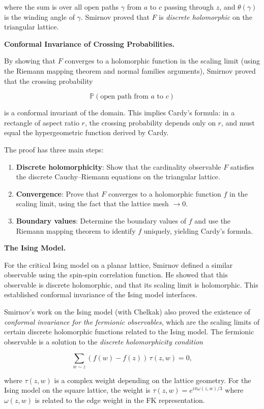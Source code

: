 where the sum is over all open paths $\gamma$ from $a$ to $c$ passing through $z$, and $\theta(\gamma)$ is the winding angle of $\gamma$. Smirnov proved that $F$ is \emph{discrete holomorphic} on the triangular lattice.

\textbf{Conformal Invariance of Crossing Probabilities.}

By showing that $F$ converges to a holomorphic function in the scaling limit (using the Riemann mapping theorem and normal families arguments), Smirnov proved that the crossing probability

\[
\mathbb{P}(\text{open path from } a \text{ to } c)
\]

is a conformal invariant of the domain. This implies Cardy's formula: in a rectangle of aspect ratio $r$, the crossing probability depends only on $r$, and must equal the hypergeometric function derived by Cardy.

The proof has three main steps:
\begin{enumerate}
  \item \textbf{Discrete holomorphicity}: Show that the cardinality observable $F$ satisfies the discrete Cauchy--Riemann equations on the triangular lattice.
  \item \textbf{Convergence}: Prove that $F$ converges to a holomorphic function $f$ in the scaling limit, using the fact that the lattice mesh $\to 0$.
  \item \textbf{Boundary values}: Determine the boundary values of $f$ and use the Riemann mapping theorem to identify $f$ uniquely, yielding Cardy's formula.
\end{enumerate}

\textbf{The Ising Model.}

For the critical Ising model on a planar lattice, Smirnov defined a similar observable using the spin-spin correlation function. He showed that this observable is discrete holomorphic, and that its scaling limit is holomorphic. This established conformal invariance of the Ising model interfaces.

Smirnov's work on the Ising model (with Chelkak) also proved the existence of \emph{conformal invariance for the fermionic observables}, which are the scaling limits of certain discrete holomorphic functions related to the Ising model. The fermionic observable is a solution to the \emph{discrete holomorphicity condition}

\[
\sum_{w \sim z} (f(w) - f(z)) \, \tau(z,w) = 0,
\]

where $\tau(z,w)$ is a complex weight depending on the lattice geometry. For the Ising model on the square lattice, the weight is $\tau(z,w) = e^{i\pi \omega(z,w)/3}$ where $\omega(z,w)$ is related to the edge weight in the FK representation.


